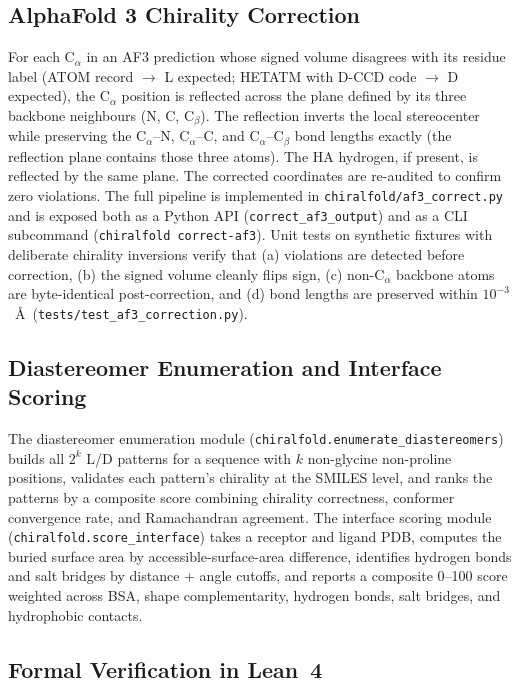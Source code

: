 \documentclass[11pt]{article}
\begin{document}
\subsection{AlphaFold 3 Chirality Correction}

For each C$_\alpha$ in an AF3 prediction whose signed volume disagrees with its residue label (ATOM record $\to$ L expected; HETATM with D-CCD code $\to$ D expected), the C$_\alpha$ position is reflected across the plane defined by its three backbone neighbours (N, C, C$_\beta$). The reflection inverts the local stereocenter while preserving the C$_\alpha$--N, C$_\alpha$--C, and C$_\alpha$--C$_\beta$ bond lengths exactly (the reflection plane contains those three atoms). The HA hydrogen, if present, is reflected by the same plane. The corrected coordinates are re-audited to confirm zero violations. The full pipeline is implemented in \texttt{chiralfold/af3\_correct.py} and is exposed both as a Python API (\texttt{correct\_af3\_output}) and as a CLI subcommand (\texttt{chiralfold correct-af3}). Unit tests on synthetic fixtures with deliberate chirality inversions verify that (a) violations are detected before correction, (b) the signed volume cleanly flips sign, (c) non-C$_\alpha$ backbone atoms are byte-identical post-correction, and (d) bond lengths are preserved within $10^{-3}$~\AA\ (\texttt{tests/test\_af3\_correction.py}).

\subsection{Diastereomer Enumeration and Interface Scoring}

The diastereomer enumeration module (\texttt{chiralfold.enumerate\_diastereomers}) builds all $2^k$ L/D patterns for a sequence with $k$ non-glycine non-proline positions, validates each pattern's chirality at the SMILES level, and ranks the patterns by a composite score combining chirality correctness, conformer convergence rate, and Ramachandran agreement. The interface scoring module (\texttt{chiralfold.score\_interface}) takes a receptor and ligand PDB, computes the buried surface area by accessible-surface-area difference, identifies hydrogen bonds and salt bridges by distance + angle cutoffs, and reports a composite 0--100 score weighted across BSA, shape complementarity, hydrogen bonds, salt bridges, and hydrophobic contacts.

\subsection{Formal Verification in Lean~4}
\label{sec:formal_methods}
\end{document}
